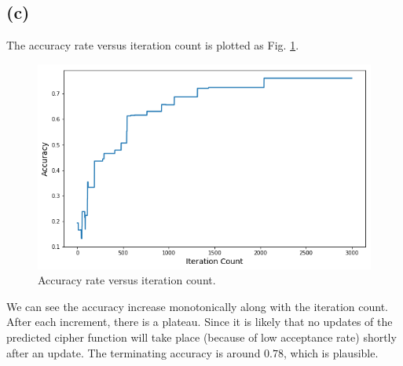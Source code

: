 \documentclass[12pt,aps,pre,reprint]{revtex4-1}
\begin{document}
\subsection{(c)}
The accuracy rate versus iteration count is plotted as Fig. \ref{fig:accuracy}. 
\begin{figure}[H]
	\centering
	\includegraphics[width=\linewidth]{pics/accuracy.png}
	\caption{Accuracy rate versus iteration count.}
	\label{fig:accuracy}
\end{figure}
We can see the accuracy increase monotonically along with the iteration count. After each increment, there is a plateau. Since it is likely that no updates of the predicted cipher function will take place (because of low acceptance rate) shortly after an update. The terminating accuracy is around $0.78$, which is plausible.
\end{document}
